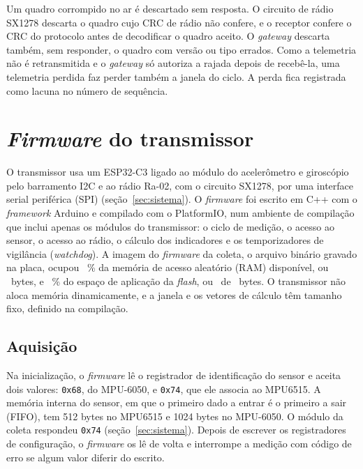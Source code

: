 Um quadro corrompido no ar é descartado sem resposta. O circuito de rádio SX1278 descarta o quadro cujo CRC de rádio não confere, e o receptor confere o CRC do protocolo antes de decodificar o quadro aceito. O \textit{gateway} descarta também, sem responder, o quadro com versão ou tipo errados. Como a telemetria não é retransmitida e o \textit{gateway} só autoriza a rajada depois de recebê-la, uma telemetria perdida faz perder também a janela do ciclo. A perda fica registrada como lacuna no número de sequência.

\section{\textit{Firmware} do transmissor}\label{sec:sis-transmissor}

O transmissor usa um ESP32-C3 ligado ao módulo do acelerômetro e giroscópio pelo barramento I2C e ao rádio Ra-02, com o circuito SX1278, por uma interface serial periférica (SPI) (seção~\ref{sec:sistema}). O \textit{firmware} foi escrito em C++ com o \textit{framework} Arduino e compilado com o PlatformIO, num ambiente de compilação que inclui apenas os módulos do transmissor: o ciclo de medição, o acesso ao sensor, o acesso ao rádio, o cálculo dos indicadores e os temporizadores de vigilância (\textit{watchdog}). A imagem do \textit{firmware} da coleta, o arquivo binário gravado na placa, ocupou \sisRamTransmissorPct~\% da memória de acesso aleatório (RAM) disponível, ou \sisRamTransmissorBytes\ bytes, e \sisFlashTransmissorPct~\% do espaço de aplicação da \textit{flash}, ou \sisFlashTransmissorBytes\ de \sisFlashTransmissorTotal\ bytes. O transmissor não aloca memória dinamicamente, e a janela e os vetores de cálculo têm tamanho fixo, definido na compilação.

\subsection{Aquisição}

Na inicialização, o \textit{firmware} lê o registrador de identificação do sensor e aceita dois valores: \texttt{0x68}, do MPU-6050, e \texttt{0x74}, que ele associa ao MPU6515. A memória interna do sensor, em que o primeiro dado a entrar é o primeiro a sair (FIFO), tem \num{512} bytes no MPU6515 e \num{1024} bytes no MPU-6050. O módulo da coleta respondeu \texttt{0x74} (seção~\ref{sec:sistema}). Depois de escrever os registradores de configuração, o \textit{firmware} os lê de volta e interrompe a medição com código de erro se algum valor diferir do escrito.

